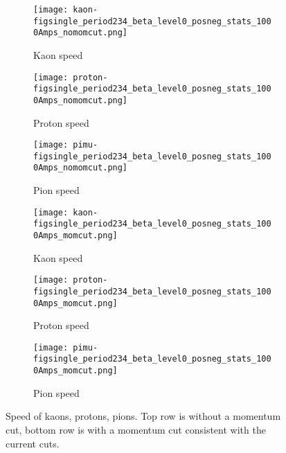      \begin{figure}[h]	
 \centering   
               \begin{subfigure}[b]{0.3\textwidth}
            \centering
            \texttt{[image: kaon-figsingle\_period234\_beta\_level0\_posneg\_stats\_1000Amps\_nomomcut.png]}
            \caption{Kaon speed}
            \end{subfigure}
             \hfill   
            \begin{subfigure}[b]{0.3\textwidth}
            \centering
            \texttt{[image: proton-figsingle\_period234\_beta\_level0\_posneg\_stats\_1000Amps\_nomomcut.png]}
            \caption{Proton speed}
            \end{subfigure}
             \hfill   
            \begin{subfigure}[b]{0.3\textwidth}
            \centering
            \texttt{[image: pimu-figsingle\_period234\_beta\_level0\_posneg\_stats\_1000Amps\_nomomcut.png]}
            \caption{Pion speed}
            \end{subfigure}
            
                           \begin{subfigure}[b]{0.3\textwidth}
            \centering
            \texttt{[image: kaon-figsingle\_period234\_beta\_level0\_posneg\_stats\_1000Amps\_momcut.png]}
            \caption{Kaon speed}
            \end{subfigure}
             \hfill   
            \begin{subfigure}[b]{0.3\textwidth}
            \centering
            \texttt{[image: proton-figsingle\_period234\_beta\_level0\_posneg\_stats\_1000Amps\_momcut.png]}
            \caption{Proton speed}
            \end{subfigure}
             \hfill   
            \begin{subfigure}[b]{0.3\textwidth}
            \centering
            \texttt{[image: pimu-figsingle\_period234\_beta\_level0\_posneg\_stats\_1000Amps\_momcut.png]}
            \caption{Pion speed}
            \end{subfigure}
\caption{Speed of kaons, protons, pions. Top row is without a momentum cut, bottom row is with a momentum cut consistent with the current cuts. }

  \end{figure}
  
